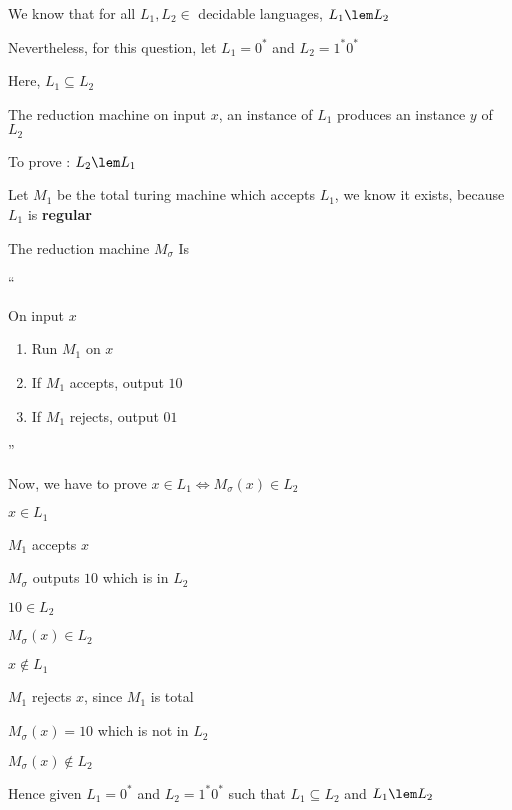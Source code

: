 
We know that for all $L_1 ,L_2 \in$ decidable languages, $L_1 \lem L_2$

Nevertheless, for this question, let $L_1 = 0^*$ and $L_2 = 1^*0^*$

Here, $L_1 \subseteq L_2$

The reduction machine on input $x$, an instance of $L_1$ produces an instance $y$ of $L_2$

To prove : $L_2 \lem L_1$

Let $M_1$ be the total turing machine which accepts $L_1$, we know it exists, because $L_1$ is \textbf{regular}

The reduction machine $M_\sigma$ Is

``

On input $x$
\begin{enumerate}
    \item Run $M_1$ on $x$
    \item If $M_1$ accepts, output $10$
    \item If $M_1$ rejects, output $01$
\end{enumerate}

''

Now, we have to prove
$x \in L_1 \Leftrightarrow M_\sigma(x) \in L_2$

$x \in L_1$

\imp
$M_1$ accepts $x$

\imp
$M_\sigma$ outputs $10$ which is in $L_2$

\imp
$10 \in L_2$

\imp
$M_\sigma(x) \in L_2$


$x \notin L_1$

\imp
$M_1$ rejects $x$, since $M_1$ is total

\imp
$M_\sigma(x) = 10$ which is not in $L_2$

\imp
$M_\sigma(x) \notin L_2$


Hence given $L_1 = 0^*$ and $L_2 = 1^*0^*$ such that $L_1 \subseteq L_2$ and $L_1 \lem L_2$
















